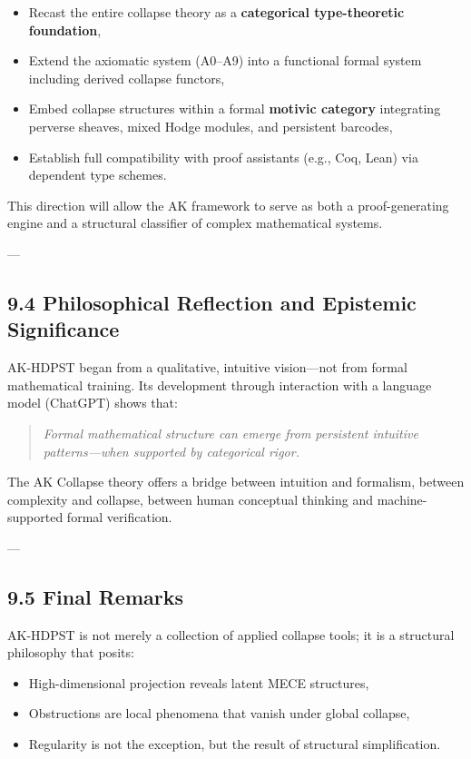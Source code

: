 \documentclass[11pt]{article}
\begin{document}
\begin{itemize}
  \item Recast the entire collapse theory as a \textbf{categorical type-theoretic foundation},
  \item Extend the axiomatic system (A0–A9) into a functional formal system including derived collapse functors,
  \item Embed collapse structures within a formal \textbf{motivic category} integrating perverse sheaves, mixed Hodge modules, and persistent barcodes,
  \item Establish full compatibility with proof assistants (e.g., Coq, Lean) via dependent type schemes.
\end{itemize}

This direction will allow the AK framework to serve as both a proof-generating engine and a structural classifier of complex mathematical systems.

---

\subsection*{9.4 Philosophical Reflection and Epistemic Significance}

AK-HDPST began from a qualitative, intuitive vision—not from formal mathematical training.  
Its development through interaction with a language model (ChatGPT) shows that:

\begin{quote}
\textit{Formal mathematical structure can emerge from persistent intuitive patterns—when supported by categorical rigor.}
\end{quote}

The AK Collapse theory offers a bridge between intuition and formalism, between complexity and collapse,  
between human conceptual thinking and machine-supported formal verification.

---

\subsection*{9.5 Final Remarks}

AK-HDPST is not merely a collection of applied collapse tools; it is a structural philosophy that posits:

\begin{itemize}
  \item High-dimensional projection reveals latent MECE structures,
  \item Obstructions are local phenomena that vanish under global collapse,
  \item Regularity is not the exception, but the result of structural simplification.
\end{itemize}
\end{document}
